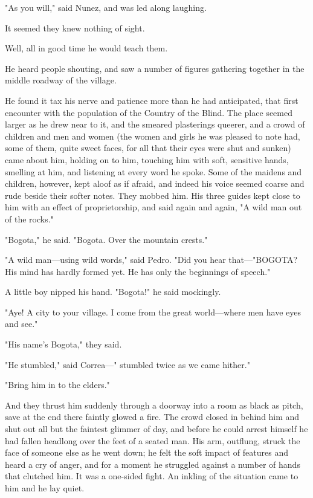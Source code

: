 \documentclass[courier]{sffms}
\begin{document}
"As you will," said Nunez, and was led along laughing.

It seemed they knew nothing of sight.

Well, all in good time he would teach them.

He heard people shouting, and saw a number of figures gathering
together in the middle roadway of the village.

He found it tax his nerve and patience more than he had anticipated,
that first encounter with the population of the Country of the
Blind. The place seemed larger as he drew near to it, and the smeared
plasterings queerer, and a crowd of children and men and women (the
women and girls he was pleased to note had, some of them, quite sweet
faces, for all that their eyes were shut and sunken) came about him,
holding on to him, touching him with soft, sensitive hands, smelling
at him, and listening at every word he spoke. Some of the maidens and
children, however, kept aloof as if afraid, and indeed his voice
seemed coarse and rude beside their softer notes. They mobbed him. His
three guides kept close to him with an effect of proprietorship, and
said again and again, "A wild man out of the rocks."

"Bogota," he said. "Bogota. Over the mountain crests."

"A wild man---using wild words," said Pedro. "Did you hear
that---"BOGOTA? His mind has hardly formed yet. He has only the
beginnings of speech."

A little boy nipped his hand. "Bogota!" he said mockingly.

"Aye! A city to your village. I come from the great world---where men
have eyes and see."

"His name's Bogota," they said.

"He stumbled," said Correa---" stumbled twice as we came hither."

"Bring him in to the elders."

And they thrust him suddenly through a doorway into a room as black as
pitch, save at the end there faintly glowed a fire. The crowd closed
in behind him and shut out all but the faintest glimmer of day, and
before he could arrest himself he had fallen headlong over the feet of
a seated man. His arm, outflung, struck the face of someone else as he
went down; he felt the soft impact of features and heard a cry of
anger, and for a moment he struggled against a number of hands that
clutched him. It was a one-sided fight. An inkling of the situation
came to him and he lay quiet.
\end{document}
